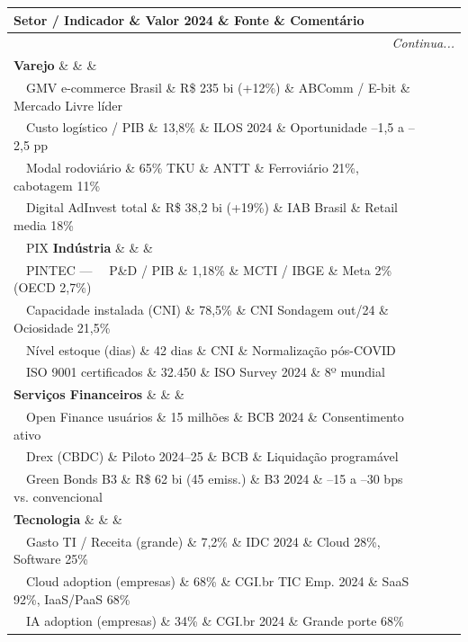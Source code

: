 \begin{longtable}{p{4cm}p{3cm}p{3cm}p{5cm}}
\toprule
\textbf{Setor / Indicador} \& \textbf{Valor 2024} \& \textbf{Fonte} \& \textbf{Comentário}\\
\midrule
\endhead
\midrule
\multicolumn{4}{r}{\textit{Continua...}} \\
\endfoot
\bottomrule
\endlastfoot

\textbf{Varejo} \&  \&  \& \\
\ \ GMV e-commerce Brasil \& R\$ 235 bi (+12\%) \& ABComm / E-bit \& Mercado Livre líder \\
\ \ Custo logístico / PIB \& 13,8\% \& ILOS 2024 \& Oportunidade –1,5 a –2,5 pp \\
\ \ Modal rodoviário \& 65\% TKU \& ANTT \& Ferroviário 21\%, cabotagem 11\% \\
\ \ Digital AdInvest total \& R\$ 38,2 bi (+19\%) \& IAB Brasil \& Retail media 18\% \\
\ \ PIX %
\textbf{Indústria} \&  \&  \& \\
\ \ PINTEC — %
\ \ P\&D / PIB \& 1,18\% \& MCTI / IBGE \& Meta 2\% (OECD 2,7\%) \\
\ \ Capacidade instalada (CNI) \& 78,5\% \& CNI Sondagem out/24 \& Ociosidade 21,5\% \\
\ \ Nível estoque (dias) \& 42 dias \& CNI \& Normalização pós-COVID\\
\ \ ISO 9001 certificados \& 32.450 \& ISO Survey 2024 \& 8º mundial\\
\textbf{Serviços Financeiros} \&  \&  \& \\
\ \ Open Finance usuários \& 15 milhões \& BCB 2024 \& Consentimento ativo\\
\ \ Drex (CBDC) \& Piloto 2024–25 \& BCB \& Liquidação programável\\
\ \ Green Bonds B3 \& R\$ 62 bi (45 emiss.) \& B3 2024 \& –15 a –30 bps vs. convencional\\
\textbf{Tecnologia} \&  \&  \& \\
\ \ Gasto TI / Receita (grande) \& 7,2\% \& IDC 2024 \& Cloud 28\%, Software 25\% \\
\ \ Cloud adoption (empresas) \& 68\% \& CGI.br TIC Emp. 2024 \& SaaS 92\%, IaaS/PaaS 68\% \\
\ \ IA adoption (empresas) \& 34\% \& CGI.br 2024 \& Grande porte 68\% \\

\end{longtable}
